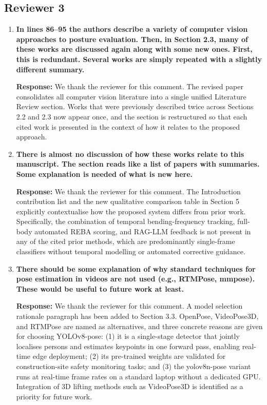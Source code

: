 \subsection*{Reviewer 3}

\begin{enumerate}
    \item \textbf{In lines 86--95 the authors describe a variety of computer vision approaches to posture evaluation. Then, in Section 2.3, many of these works are discussed again along with some new ones. First, this is redundant. Several works are simply repeated with a slightly different summary.}

    \textbf{Response:} We thank the reviewer for this comment. The revised paper consolidates all computer vision literature into a single unified Literature Review section. Works that were previously described twice across Sections 2.2 and 2.3 now appear once, and the section is restructured so that each cited work is presented in the context of how it relates to the proposed approach.

    \item \textbf{There is almost no discussion of how these works relate to this manuscript. The section reads like a list of papers with summaries. Some explanation is needed of what is new here.}

    \textbf{Response:} We thank the reviewer for this comment. The Introduction contribution list and the new qualitative comparison table in Section 5 explicitly contextualise how the proposed system differs from prior work. Specifically, the combination of temporal bending-frequency tracking, full-body automated REBA scoring, and RAG-LLM feedback is not present in any of the cited prior methods, which are predominantly single-frame classifiers without temporal modelling or automated corrective guidance.

    \item \textbf{There should be some explanation of why standard techniques for pose estimation in videos are not used (e.g., RTMPose, mmpose). These would be useful to future work at least.}

    \textbf{Response:} We thank the reviewer for this comment. A model selection rationale paragraph has been added to Section 3.3. OpenPose, VideoPose3D, and RTMPose are named as alternatives, and three concrete reasons are given for choosing YOLOv8-pose: (1) it is a single-stage detector that jointly localises persons and estimates keypoints in one forward pass, enabling real-time edge deployment; (2) its pre-trained weights are validated for construction-site safety monitoring tasks; and (3) the yolov8n-pose variant runs at real-time frame rates on a standard laptop without a dedicated GPU. Integration of 3D lifting methods such as VideoPose3D is identified as a priority for future work.


\end{enumerate}
